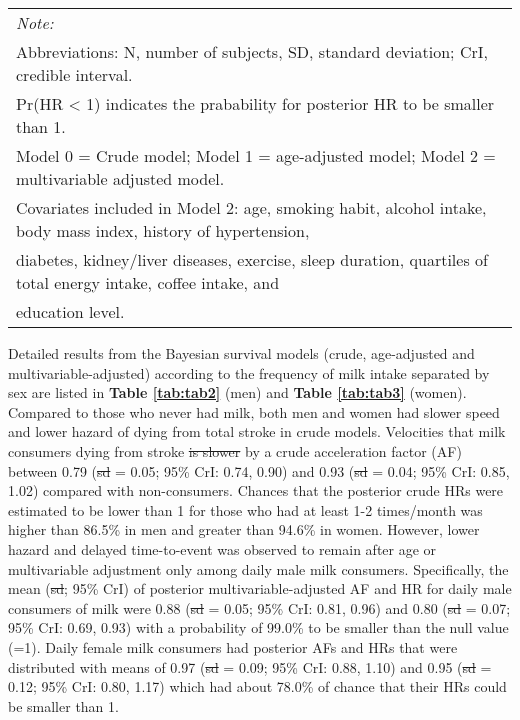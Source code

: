 \documentclass[nutrients,article,submitted,moreauthors,pdftex]{Definitions/mdpi}
\providecommand{\DIFadd}[1]{{\protect\color{blue}\uwave{#1}}} %
\providecommand{\DIFdel}[1]{{\protect\color{red}\sout{#1}}}                      %
\providecommand{\DIFaddbegin}{} %
\providecommand{\DIFaddend}{} %
\providecommand{\DIFdelbegin}{} %
\providecommand{\DIFdelend}{} %
\newcommand{\DIFscaledelfig}{0.5}
\newlength{\DIFdelgraphicswidth} %
\newlength{\DIFdelgraphicsheight} %
\newcommand{\DIFaddincludegraphics}[2][]{{\color{blue}\fbox{\DIFOincludegraphics[#1]{#2}}}} %
\newcommand{\DIFdelincludegraphics}[2][]{%
\sbox{\DIFdelgraphicsbox}{\DIFOincludegraphics[#1]{#2}}%
\settoboxwidth{\DIFdelgraphicswidth}{\DIFdelgraphicsbox} %
\settoboxtotalheight{\DIFdelgraphicsheight}{\DIFdelgraphicsbox} %
\scalebox{\DIFscaledelfig}{%
\parbox[b]{\DIFdelgraphicswidth}{\usebox{\DIFdelgraphicsbox}\\[-\baselineskip] \rule{\DIFdelgraphicswidth}{0em}}\llap{\resizebox{\DIFdelgraphicswidth}{\DIFdelgraphicsheight}{%
\setlength{\unitlength}{\DIFdelgraphicswidth}%
\begin{picture}(1,1)%
\thicklines\linethickness{2pt} %
{\color[rgb]{1,0,0}\put(0,0){\framebox(1,1){}}}%
{\color[rgb]{1,0,0}\put(0,0){\line( 1,1){1}}}%
{\color[rgb]{1,0,0}\put(0,1){\line(1,-1){1}}}%
\end{picture}%
}\hspace*{3pt}}} %
} %
\DeclareRobustCommand{\DIFaddbegin}{\DIFOaddbegin \let\includegraphics\DIFaddincludegraphics} %
\DeclareRobustCommand{\DIFaddend}{\DIFOaddend \let\includegraphics\DIFOincludegraphics} %
\DeclareRobustCommand{\DIFdelbegin}{\DIFOdelbegin \let\includegraphics\DIFdelincludegraphics} %
\DeclareRobustCommand{\DIFdelend}{\DIFOaddend \let\includegraphics\DIFOincludegraphics} %
\begin{document}
\begin{table}[H]
{\begin{tabular}[t]{lccccc}
\bottomrule
\multicolumn{6}{l}{\textit{Note: }}\\
\multicolumn{6}{l}{Abbreviations: N, number of subjects, SD, standard deviation; CrI, credible interval.}\\
\multicolumn{6}{l}{ Pr(HR < 1) indicates the prabability for posterior HR to be smaller than 1.}\\
\multicolumn{6}{l}{Model 0 = Crude model; Model 1 = age-adjusted model; Model 2 = multivariable adjusted model.}\\
\multicolumn{6}{l}{Covariates included in Model 2: age, smoking habit, alcohol intake, body mass index, history of hypertension, }\\
\multicolumn{6}{l}{diabetes, kidney/liver diseases, exercise, sleep duration,  quartiles of total energy intake, coffee intake, and }\\
\multicolumn{6}{l}{education level.}\\
\end{tabular}}
\end{table}


Detailed results from the Bayesian survival models (crude, age-adjusted
and multivariable-adjusted) according to the frequency of milk intake
separated by sex are listed in \textbf{Table \ref{tab:tab2}} (men) and
\textbf{Table \ref{tab:tab3}} (women). Compared to those who never had
milk, both men and women had slower speed and lower hazard of dying from
total stroke in crude models. Velocities that milk consumers dying from
stroke \DIFdelbegin \DIFdel{is slower }\DIFdelend \DIFaddbegin \DIFadd{was slowed down }\DIFaddend by a crude acceleration factor (AF) between 0.79
(\DIFdelbegin \DIFdel{sd }\DIFdelend \DIFaddbegin \DIFadd{SD }\DIFaddend = 0.05; 95\% CrI: 0.74, 0.90) and 0.93 (\DIFdelbegin \DIFdel{sd }\DIFdelend \DIFaddbegin \DIFadd{SD }\DIFaddend = 0.04; 95\% CrI: 0.85,
1.02) compared with non-consumers. Chances that the posterior crude HRs were estimated to be lower
than 1 for those who had at least 1-2 times/month was higher than 86.5\%
in men and greater than 94.6\% in women. However, lower hazard and
delayed time-to-event was observed to remain after age or multivariable
adjustment only among daily male milk consumers. Specifically, the mean
(\DIFdelbegin \DIFdel{sd}\DIFdelend \DIFaddbegin \DIFadd{SD}\DIFaddend ; 95\% CrI) of posterior multivariable-adjusted AF and HR for daily
male consumers of milk were 0.88 (\DIFdelbegin \DIFdel{sd }\DIFdelend \DIFaddbegin \DIFadd{SD }\DIFaddend = 0.05; 95\% CrI: 0.81, 0.96) and
0.80 (\DIFdelbegin \DIFdel{sd }\DIFdelend \DIFaddbegin \DIFadd{SD }\DIFaddend = 0.07; 95\% CrI: 0.69, 0.93) with a probability of 99.0\% to
be smaller than the null value (=1). Daily female milk consumers had
posterior AFs and HRs that were distributed with means of 0.97 (\DIFdelbegin \DIFdel{sd }\DIFdelend \DIFaddbegin \DIFadd{SD }\DIFaddend =
0.09; 95\% CrI: 0.88, 1.10) and 0.95 (\DIFdelbegin \DIFdel{sd }\DIFdelend \DIFaddbegin \DIFadd{SD }\DIFaddend = 0.12; 95\% CrI: 0.80, 1.17)
which had about 78.0\% of chance that their HRs could be smaller than 1.
\end{document}
